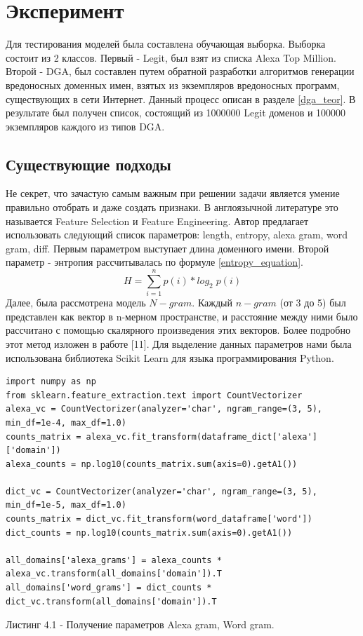 \section{Эксперимент}\label{experiment}
    Для тестирования моделей была составлена обучающая выборка. Выборка состоит из 2 классов. Первый - Legit, был взят из списка Alexa Top Million. Второй - DGA, был составлен путем обратной разработки алгоритмов генерации вредоносных доменных имен, взятых из экземпляров вредоносных программ, существующих в сети Интернет. Данный процесс описан в разделе \ref{dga_teor}. В результате был получен список, состоящий из 1000000 Legit доменов и 100000 экземпляров каждого из типов DGA.
    \subsection{Существующие подходы}\label{be_class_exp}
    Не секрет, что зачастую самым важным при решении задачи является умение правильно отобрать и даже создать признаки. В англоязычной литературе это называется Feature Selection и Feature Engineering. Автор предлагает использовать следующий список параметров: length, entropy, alexa gram, word gram, diff.
    Первым параметром выступает длина доменного имени.
    Второй параметр - энтропия рассчитывалась по формуле \ref{entropy_equation}.
    \begin{equation}\label{entropy_equation}
    H = \sum_{i=1}^{n} p(i)*log_{2}\;p(i{})
    \end{equation}
    Далее, была рассмотрена модель $N-gram$. Каждый $n-gram$ (от 3 до 5) был представлен как вектор в n-мерном пространстве, и расстояние между ними было рассчитано с помощью скалярного произведения этих векторов. Более подробно этот метод изложен в работе [11].
    Для выделение данных параметров нами была использована библиотека Scikit Learn для языка программирования Python.
    \begin{lstlisting}
import numpy as np
from sklearn.feature_extraction.text import CountVectorizer
alexa_vc = CountVectorizer(analyzer='char', ngram_range=(3, 5), min_df=1e-4, max_df=1.0)
counts_matrix = alexa_vc.fit_transform(dataframe_dict['alexa']['domain'])
alexa_counts = np.log10(counts_matrix.sum(axis=0).getA1())

dict_vc = CountVectorizer(analyzer='char', ngram_range=(3, 5), min_df=1e-5, max_df=1.0)
counts_matrix = dict_vc.fit_transform(word_dataframe['word'])
dict_counts = np.log10(counts_matrix.sum(axis=0).getA1())

all_domains['alexa_grams'] = alexa_counts * alexa_vc.transform(all_domains['domain']).T
all_domains['word_grams'] = dict_counts * dict_vc.transform(all_domains['domain']).T
    \end{lstlisting}
    Листинг 4.1 - Получение параметров Alexa gram, Word gram.


